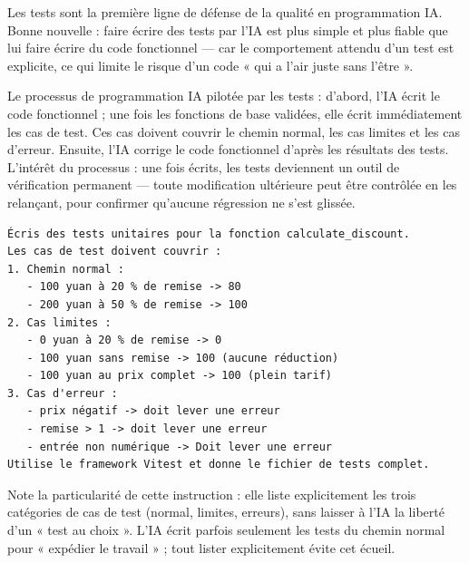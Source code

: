 


Les tests sont la première ligne de défense de la qualité en programmation IA. Bonne nouvelle : faire écrire des tests par l'IA est plus simple et plus fiable que lui faire écrire du code fonctionnel — car le comportement attendu d'un test est explicite, ce qui limite le risque d'un code « qui a l'air juste sans l'être ».

Le processus de programmation IA pilotée par les tests : d'abord, l'IA écrit le code fonctionnel ; une fois les fonctions de base validées, elle écrit immédiatement les cas de test. Ces cas doivent couvrir le chemin normal, les cas limites et les cas d'erreur. Ensuite, l'IA corrige le code fonctionnel d'après les résultats des tests. L'intérêt du processus : une fois écrits, les tests deviennent un outil de vérification permanent — toute modification ultérieure peut être contrôlée en les relançant, pour confirmer qu'aucune régression ne s'est glissée.

\begin{lstlisting}
Écris des tests unitaires pour la fonction calculate_discount.
Les cas de test doivent couvrir :
1. Chemin normal :
   - 100 yuan à 20 % de remise -> 80
   - 200 yuan à 50 % de remise -> 100
2. Cas limites :
   - 0 yuan à 20 % de remise -> 0
   - 100 yuan sans remise -> 100 (aucune réduction)
   - 100 yuan au prix complet -> 100 (plein tarif)
3. Cas d'erreur :
   - prix négatif -> doit lever une erreur
   - remise > 1 -> doit lever une erreur
   - entrée non numérique -> Doit lever une erreur
Utilise le framework Vitest et donne le fichier de tests complet.
\end{lstlisting}

Note la particularité de cette instruction : elle liste explicitement les trois catégories de cas de test (normal, limites, erreurs), sans laisser à l'IA la liberté d'un « test au choix ». L'IA écrit parfois seulement les tests du chemin normal pour « expédier le travail » ; tout lister explicitement évite cet écueil.

